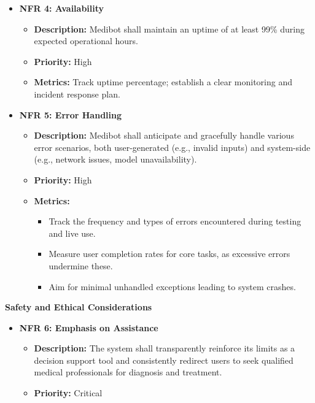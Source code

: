 \begin{itemize}
    \item \textbf{NFR 4: Availability} 
        \begin{itemize}
            \item \textbf{Description:} Medibot shall maintain an uptime of at least 99\% during expected operational hours. 
            \item \textbf{Priority:} High
            \item \textbf{Metrics:} Track uptime percentage; establish a clear monitoring and incident response plan.
        \end{itemize}

        \item \textbf{NFR 5: Error Handling}
        \begin{itemize}
            \item \textbf{Description:} Medibot shall anticipate and gracefully handle various error scenarios, both  user-generated (e.g., invalid inputs)  and system-side (e.g., network issues, model unavailability). 
            \item \textbf{Priority:} High
            \item \textbf{Metrics:}
                \begin{itemize}
                    \item  Track the frequency and types of errors encountered during testing and live use.
                    \item  Measure user completion rates for core tasks, as excessive errors undermine these.
                    \item  Aim for minimal unhandled exceptions leading to system crashes.
                \end{itemize} 
        \end{itemize}
\end{itemize}


\textbf{Safety and Ethical Considerations} 

\begin{itemize}
   \item \textbf{NFR 6: Emphasis on Assistance} 
         \begin{itemize}
            \item \textbf{Description:}  The system shall transparently reinforce its limits as a decision support tool and consistently redirect users to seek qualified medical professionals for diagnosis and treatment.
            \item \textbf{Priority:} Critical
        \end{itemize}
\end{itemize}

